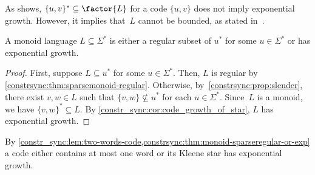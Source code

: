 As 
shows, $\{u,v\}^* \subseteq \factor{L}$ for a code $\{u,v\}$ does not imply exponential growth.
However, it implies that~$L$ cannot be bounded, as stated in~\cite[Lem.~5.3]{Ginsburg1964BOUNDEDAL}. 

\begin{corollary} \label{constrsync:thm:monoid-sparseregular-or-exp}
	A monoid language $L \subseteq \Sigma^*$ is either
	a regular subset of $u^*$ for some $u \in \Sigma^*$ or has exponential growth.
\end{corollary}
\begin{proof}
	First, suppose $L \subseteq u^*$ for some $u \in \Sigma^*$.
	Then, $L$ is regular by \cref{constrsync:thm:sparsemonoid-regular}.
	Otherwise, by~\cref{constrsync:prop:slender},
	there exist $v,w \in L$
	such that $\{v,w\} \not\subseteq u^*$ for each $u \in \Sigma^*$.
	Since~$L$ is a monoid, we have $\{v,w\}^* \subseteq L$.
	By \cref{constr_sync:cor:code_growth_of_star}, $L$ has exponential growth.	
\end{proof}

By \cref{constr_sync:lem:two-words-code,constrsync:thm:monoid-sparseregular-or-exp} a code 
either contains at most one word or its Kleene star has exponential growth.

